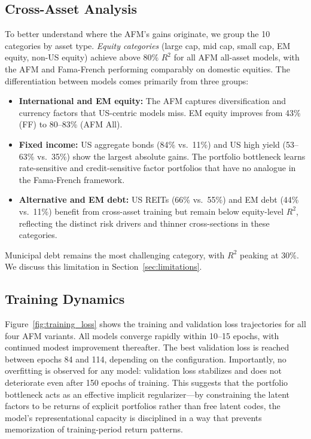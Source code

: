 \subsection{Cross-Asset Analysis}\label{sec:cross_asset}

To better understand where the AFM's gains originate, we group the 10 categories by asset type. \emph{Equity categories} (large cap, mid cap, small cap, EM equity, non-US equity) achieve above 80\% $R^2$ for all AFM all-asset models, with the AFM and Fama-French performing comparably on domestic equities. The differentiation between models comes primarily from three groups:

\begin{itemize}[leftmargin=*,itemsep=2pt]
    \item \textbf{International and EM equity:} The AFM captures diversification and currency factors that US-centric models miss. EM equity improves from 43\% (FF) to 80--83\% (AFM All).
    \item \textbf{Fixed income:} US aggregate bonds (84\% vs.\ 11\%) and US high yield (53--63\% vs.\ 35\%) show the largest absolute gains. The portfolio bottleneck learns rate-sensitive and credit-sensitive factor portfolios that have no analogue in the Fama-French framework.
    \item \textbf{Alternative and EM debt:} US REITs (66\% vs.\ 55\%) and EM debt (44\% vs.\ 11\%) benefit from cross-asset training but remain below equity-level $R^2$, reflecting the distinct risk drivers and thinner cross-sections in these categories.
\end{itemize}

Municipal debt remains the most challenging category, with $R^2$ peaking at 30\%. We discuss this limitation in Section~\ref{sec:limitations}.

\subsection{Training Dynamics}\label{sec:training_dynamics}

Figure~\ref{fig:training_loss} shows the training and validation loss trajectories for all four AFM variants. All models converge rapidly within 10--15 epochs, with continued modest improvement thereafter. The best validation loss is reached between epochs 84 and 114, depending on the configuration. Importantly, no overfitting is observed for any model: validation loss stabilizes and does not deteriorate even after 150 epochs of training. This suggests that the portfolio bottleneck acts as an effective implicit regularizer---by constraining the latent factors to be returns of explicit portfolios rather than free latent codes, the model's representational capacity is disciplined in a way that prevents memorization of training-period return patterns.

